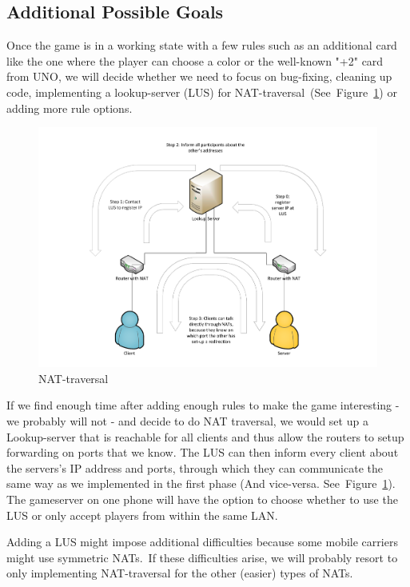 \documentclass{sig-alternate}
\newcommand{\lfig}[1]{\label{fig:#1}}
\newcommand{\rfig}[1]{Figure~\ref{fig:#1}}
\begin{document}
\subsection{Additional Possible Goals}
Once the game is in a working state with a few rules such as an additional card like the one where the player can choose a color or the well-known "+2" card from UNO, we will decide whether we need to focus on bug-fixing, cleaning up code, implementing a lookup-server (LUS) for NAT-traversal~(See~\rfig{nat}) or adding more rule options. 

\begin{figure}[!htbp]
	\centering
    \includegraphics[width=\columnwidth]{NATholepunching.pdf}
    \vspace{-5mm} %
	\caption{NAT-traversal}
	\lfig{nat}
\end{figure}

If we find enough time after adding enough rules to make the game interesting - we probably will not - and decide to do NAT traversal, we would set up a Lookup-server that is reachable for all clients and thus allow the routers to setup forwarding on ports that we know. The LUS can then inform every client about the servers's IP address and ports, through which they can communicate the same way as we implemented in the first phase (And vice-versa. See~\rfig{nat}). The gameserver on one phone will have the option to choose whether to use the LUS or only accept players from within the same LAN.

Adding a LUS might impose additional difficulties because some mobile carriers might use symmetric NATs.~\cite{natwiki}If these difficulties arise, we will probably resort to only implementing NAT-traversal for the other (easier) types of NATs.
\end{document}
